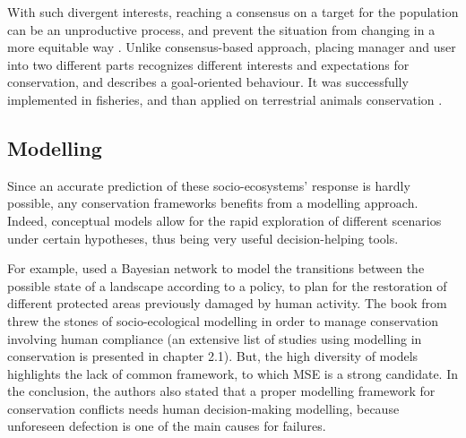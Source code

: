 \documentclass[12pt,a4paper]{article}
\begin{document}
With such divergent interests, reaching a consensus on a target for the population can be an unproductive process, and prevent the situation from changing in a more equitable way \citep{peterson2005conservation}.
Unlike consensus-based approach, placing manager and user into two different parts recognizes different interests and expectations for conservation, and describes a goal-oriented behaviour.
It was successfully implemented in fisheries, and than applied on terrestrial animals conservation \citep{BUNNEFELD2011441, bunnefeld2013incentivizing}.

\subsection{Modelling}

Since an accurate prediction of these socio-ecosystems' response is hardly possible, any conservation frameworks benefits from a modelling approach.
Indeed, conceptual models allow for the rapid exploration of different scenarios under certain hypotheses, thus being very useful decision-helping tools.
%

For example, \cite{rumpff2011state} used a Bayesian network to model the transitions between the possible state of a landscape according to a policy, to plan for the restoration of different protected areas previously damaged by human activity.
The book from \cite{schluter2012new} threw the stones of socio-ecological modelling in order to manage conservation involving human compliance (an extensive list of studies using modelling in conservation is presented in chapter 2.1).
But, the high diversity of models highlights the lack of common framework, to which MSE is a strong candidate.
In the conclusion, the authors also stated that a proper modelling framework for conservation conflicts needs human decision-making modelling, because unforeseen defection is one of the main causes for failures.\\
%
\end{document}
